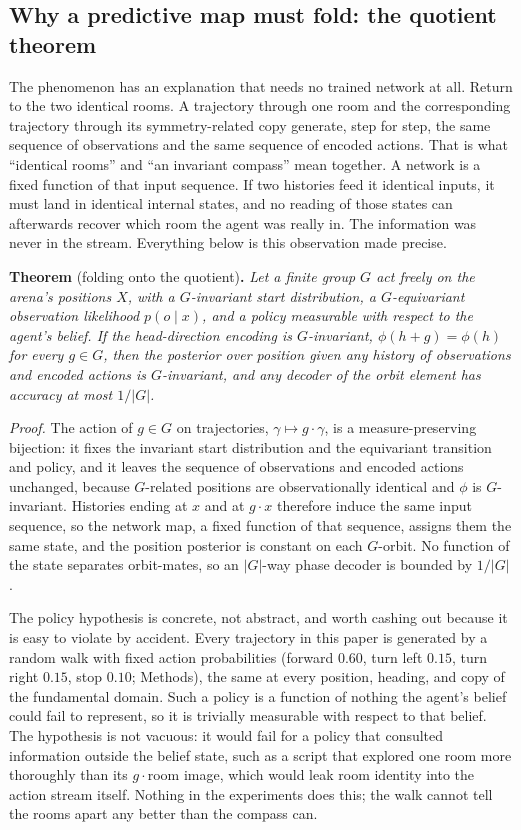 \documentclass[9pt,lineno]{elife}
\begin{document}
\subsection{Why a predictive map must fold: the quotient theorem}

The phenomenon has an explanation that needs no trained network at all. Return to the two identical
rooms. A trajectory through one room and the corresponding trajectory through its symmetry-related
copy generate, step for step, the same sequence of observations and the same sequence of encoded
actions. That is what ``identical rooms'' and ``an invariant compass'' mean together. A network is
a fixed function of that input sequence. If two histories feed it identical inputs, it must land in
identical internal states, and no reading of those states can afterwards recover which room the agent
was really in. The information was never in the stream. Everything below is this observation made
precise.

\noindent\textbf{Theorem} (folding onto the quotient)\textbf{.} \emph{Let a finite group $G$ act
freely on the arena's positions $X$, with a $G$-invariant start distribution, a $G$-equivariant
observation likelihood $p(o \mid x)$, and a policy measurable with respect to the agent's belief. If
the head-direction encoding is $G$-invariant, $\phi(h + g) = \phi(h)$ for every $g \in G$, then the
posterior over position given any history of observations and encoded actions is $G$-invariant, and
any decoder of the orbit element has accuracy at most $1/|G|$.}

\noindent\emph{Proof.} The action of $g \in G$ on trajectories, $\gamma \mapsto g\cdot\gamma$, is a
measure-preserving bijection: it fixes the invariant start distribution and the equivariant
transition and policy, and it leaves the sequence of observations and encoded actions unchanged,
because $G$-related positions are observationally identical and $\phi$ is $G$-invariant. Histories
ending at $x$ and at $g\cdot x$ therefore induce the same input sequence, so the network map, a
fixed function of that sequence, assigns them the same state, and the position posterior is constant
on each $G$-orbit. No function of the state separates orbit-mates, so an $|G|$-way phase decoder is
bounded by $1/|G|$.

The policy hypothesis is concrete, not abstract, and worth cashing out because it is easy to violate
by accident. Every trajectory in this paper is generated by a random walk with fixed action
probabilities (forward $0.60$, turn left $0.15$, turn right $0.15$, stop $0.10$; Methods), the same
at every position, heading, and copy of the fundamental domain. Such a policy is a function of
nothing the agent's belief could fail to represent, so it is trivially measurable with respect to
that belief. The hypothesis is not vacuous: it would fail for a policy that consulted information
outside the belief state, such as a script that explored one room more thoroughly than its $g\cdot$room
image, which would leak room identity into the action stream itself. Nothing in the experiments
does this; the walk cannot tell the rooms apart any better than the compass can.
\end{document}
